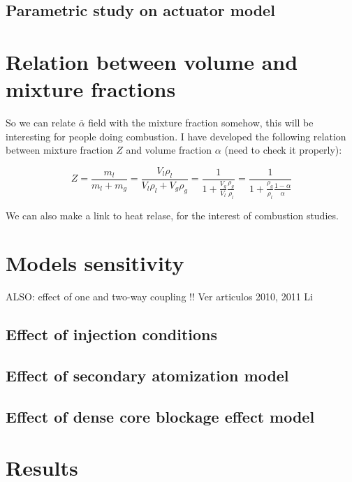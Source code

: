 \subsection{Parametric study on actuator model}


\section{Relation between volume and mixture fractions}

So we can relate $\overline{\alpha}$ field with the mixture fraction somehow, this will be interesting for people doing combustion. I have developed the following relation between mixture fraction $Z$ and volume fraction $\alpha$ (need to check it properly):

\begin{equation}
Z = \frac{m_l}{m_l + m_g} = \frac{V_l \rho_l}{V_l \rho_l + V_g \rho_g} = \frac{1}{1 + \frac{V_g}{V_l} \frac{\rho_g}{\rho_l}} = \frac{1}{1 + \frac{\rho_g}{\rho_l} \frac{1 - \alpha}{\alpha}}
\end{equation}


We can also make a link to heat relase, for the interest of combustion studies.




\section{Models sensitivity}

ALSO: effect of one and two-way coupling !! Ver articulos 2010, 2011 Li 

\subsection{Effect of injection conditions}

\subsection{Effect of secondary atomization model}

\subsection{Effect of dense core blockage effect model}

\section{Results}

